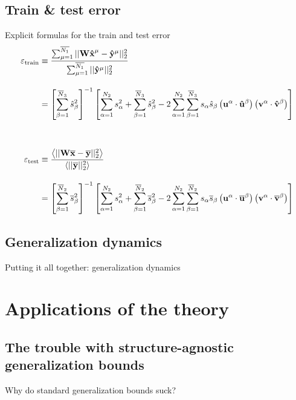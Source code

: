 \documentclass{beamer}
\newcommand{\bb}[1]{{\bf\overline{#1}}}
\newcommand{\bh}[1]{{\bf\hat{#1}}}
\newcommand{\trainerr}{\mathcal{\varepsilon}_\text{train}}
\newcommand{\generr}{\mathcal{\varepsilon}_\text{test}}
\begin{document}
\subsection{Train \& test error}
\begin{frame}{Explicit formulas for the train and test error}
\footnotesize
\begin{align*}
\trainerr &\equiv \frac{\sum_{\mu=1}^{\overline{N_1}} \vert\vert{\bf W \bh{x}}^\mu - \bh{y}^\mu\vert\vert^2_2}{\sum_{\mu=1}^{\overline{N_1}} \vert\vert \bh{y}^\mu \vert\vert^2_2 }\\[1em]
 &= \left[\sum_{\beta=1}^{\overline{N}_3} \hat{s}_{\beta}^2\right]^{-1} 
\left[ \sum_{\alpha=1}^{N_2} s_{\alpha}^2 +  \sum_{\beta=1}^{\overline{N}_3} \hat{s}_{\beta}^2
- 2 \sum_{\alpha=1}^{N_2} \sum_{\beta=1}^{\overline{N}_3}  s_{\alpha} \hat{s}_{\beta} \left({\bf u}^{\alpha} \cdot \bf{\hat u}^{\beta} \right) \left({\bf v}^{\alpha} \cdot \bf{\hat v}^{\beta} \right)\right]\\[3em]
\generr &\equiv   \frac{ \left\langle \vert\vert{\bf W}\bb{x} - \bb{y} \vert\vert^2_2 \right \rangle} 
                      { \left\langle  \vert\vert \bb{y} \vert\vert^2_2  \right \rangle} \\[1em]
 &= \left[\sum_{\beta=1}^{\overline{N}_2} \overline{s}_{\beta}^2\right]^{-1} 
\left[ \sum_{\alpha=1}^{N_2} s_{\alpha}^2 +  \sum_{\beta=1}^{\overline{N}_2} \overline{s}_{\beta}^2
- 2 \sum_{\alpha=1}^{N_2} \sum_{\beta=1}^{\overline{N}_2}  s_{\alpha} \overline{s}_{\beta} \left({\bf u}^{\alpha} \cdot \bb{u}^{\beta} \right) \left({\bf v}^{\alpha} \cdot \bb{v}^{\beta} \right)\right]
\end{align*}
\end{frame}


\subsection{Generalization dynamics}
\begin{frame}{Putting it all together: generalization dynamics}

\end{frame}


\section{Applications of the theory}

\subsection{The trouble with structure-agnostic generalization bounds}
\begin{frame}{Why do standard generalization bounds suck?}
\end{frame}
\end{document}
